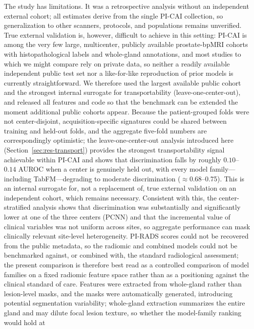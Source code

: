 \documentclass[11pt]{article}
\begin{document}
The study has limitations. It was a retrospective analysis without an independent
external cohort; all estimates derive from the single PI-CAI collection, so
generalization to other scanners, protocols, and populations remains unverified.
True external validation is, however, difficult to achieve in this setting: PI-CAI
is among the very few large, multicenter, publicly available prostate-bpMRI cohorts
with histopathological labels and whole-gland annotations, and most studies to
which we might compare rely on private data, so neither a readily available
independent public test set nor a like-for-like reproduction of prior models is
currently straightforward. We
therefore used the largest available public cohort and the strongest internal
surrogate for transportability (leave-one-center-out), and released all features and
code so that the benchmark can be extended the moment additional public cohorts
appear.
Because the patient-grouped folds were not center-disjoint, acquisition-specific
signatures could be shared between training and held-out folds, and the aggregate
five-fold numbers are correspondingly optimistic; the leave-one-center-out analysis
introduced here (Section~\ref{sec:res-transport}) provides the strongest
transportability signal achievable within PI-CAI and shows that discrimination
falls by roughly $0.10$--$0.14$ AUROC when a center is genuinely held out, with every
model family---including TabFM---degrading to moderate discrimination
($\approx$0.68--0.75). This is an internal surrogate for, not a replacement of, true
external validation on an independent cohort, which remains necessary. Consistent
with this, the center-stratified analysis shows that discrimination was
substantially and significantly lower at one of the three centers (PCNN) and that
the incremental value of clinical variables was not uniform across sites, so
aggregate performance can mask clinically relevant site-level heterogeneity.
PI-RADS scores could not be recovered from the public metadata, so
the radiomic and combined models could not be benchmarked against, or combined
with, the standard radiological assessment; the present comparison is therefore
best read as a controlled comparison of model families on a fixed radiomic feature
space rather than as a positioning against the clinical standard of care.
Features were extracted from whole-gland rather than lesion-level masks, and the
masks were automatically generated, introducing potential segmentation
variability; whole-gland extraction summarizes the entire gland and may dilute
focal lesion texture, so whether the model-family ranking would hold at
\end{document}
